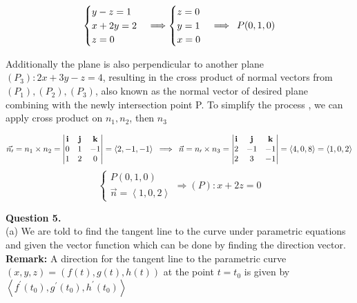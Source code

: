 \documentclass[a4paper]{exam}
\begin{document}
	$$
	\begin{cases} 
		y - z = 1 \\ 
		x + 2y = 2 \\ 
		z = 0 
	\end{cases} \Longrightarrow \begin{cases}
	z = 0\\
	y = 1\\
	x = 0
	\end{cases} \Longrightarrow \hspace*{0.5em} P(0, 1, 0)$$
	
	\noindent Additionally the plane is also perpendicular to another plane $(P_{3}) : 2x + 3y - z = 4$, resulting in the cross product of normal vectors from $(P_{1}), (P_{2}), (P_{3})$, also known as the normal vector of desired plane combining with the newly intersection point P. To simplify the process , we can apply cross product on $n_{1}, n_{2}$, then $n_{3}$
	
	$$ 
	\vec{n_{\prime}} = n_{1} \times n_{2} = \begin{vmatrix} 
		\mathbf{i} & \mathbf{j} & \mathbf{k} \\ 
		0 & 1 & -1 \\ 
		1 & 2 & 0 
	\end{vmatrix} = \left\langle 2, -1, -1 \right\rangle  
	\hspace*{0.5em} \Longrightarrow \hspace*{0.5em} \vec{n} = n_{\prime} \times n_{3} = \begin{vmatrix} 
		\mathbf{i} & \mathbf{j} & \mathbf{k} \\ 
		2 & -1 & -1 \\ 
		2 & 3 & -1 
	\end{vmatrix} = \left\langle 4, 0, 8 \right\rangle = \left\langle 1, 0, 2 \right\rangle
	$$
	$$\begin{cases}
		P(0, 1, 0) \\
		\vec{n} = \left\langle 1, 0, 2 \right\rangle
	\end{cases} \Longrightarrow (P) : x + 2z = 0$$
 	
	\noindent \textbf{Question 5.} \\[0.5em]
	\noindent (a) We are told to find the tangent line to the curve under parametric equations and given the vector function which can be done by finding the direction vector. \\[0.25em]
	
	\noindent \textbf{Remark:} A direction for the tangent line to the parametric curve $(x, y, z) = (f(t), g(t), h(t))$ at the point $t = t_{0}$ is given by $\left\langle f^{\prime}(t_{0}), g^{\prime}(t_{0}), h^{\prime}(t_{0}) \right\rangle$ \\[0.25em]
	
\end{document}
